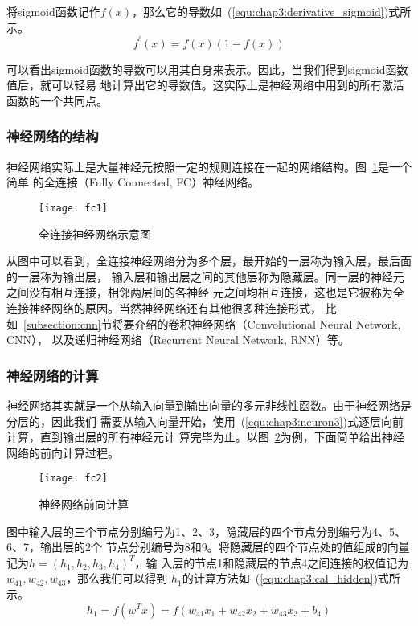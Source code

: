 将sigmoid函数记作$f(x)$，那么它的导数如~(\ref{equ:chap3:derivative_sigmoid})式所示。
\begin{equation}
  \label{equ:chap3:derivative_sigmoid}
  f^\prime(x) = f(x)(1-f(x))
\end{equation}

可以看出sigmoid函数的导数可以用其自身来表示。因此，当我们得到sigmoid函数值后，就可以轻易
地计算出它的导数值。这实际上是神经网络中用到的所有激活函数的一个共同点。

\subsubsection{神经网络的结构}

神经网络实际上是大量神经元按照一定的规则连接在一起的网络结构。图~\ref{fig:fc1}是一个简单
的全连接（Fully Connected, FC）神经网络。
\begin{figure}[ht]
  \centering
  \texttt{[image: fc1]}
  \caption{全连接神经网络示意图}
  \label{fig:fc1}
\end{figure}

从图中可以看到，全连接神经网络分为多个层，最开始的一层称为输入层，最后面的一层称为输出层，
输入层和输出层之间的其他层称为隐藏层。同一层的神经元之间没有相互连接，相邻两层间的各神经
元之间均相互连接，这也是它被称为全连接神经网络的原因。当然神经网络还有其他很多种连接形式，
比如~\ref{subsection:cnn}节将要介绍的卷积神经网络（Convolutional Neural Network, CNN），
以及递归神经网络（Recurrent Neural Network, RNN）等。

\subsubsection{神经网络的计算}

神经网络其实就是一个从输入向量到输出向量的多元非线性函数。由于神经网络是分层的，因此我们
需要从输入向量开始，使用~(\ref{equ:chap3:neuron3})式逐层向前计算，直到输出层的所有神经元计
算完毕为止。以图~\ref{fig:fc2}为例，下面简单给出神经网络的前向计算过程。
\begin{figure}[ht]
  \centering
  \texttt{[image: fc2]}
  \caption{神经网络前向计算}
  \label{fig:fc2}
\end{figure}

图中输入层的三个节点分别编号为1、2、3，隐藏层的四个节点分别编号为4、5、6、7，输出层的2个
节点分别编号为8和9。将隐藏层的四个节点处的值组成的向量记为$h=(h_1, h_2, h_3, h_4)^T$，输
入层的节点1和隐藏层的节点4之间连接的权值记为$w_{41}, w_{42}, w_{43}$，那么我们可以得到
$h_1$的计算方法如~(\ref{equ:chap3:cal_hidden})式所示。
\begin{equation}
  \label{equ:chap3:cal_hidden}
  h_1 = f(w^Tx)=f(w_{41}x_1+w_{42}x_2+w_{43}x_3+b_4)
\end{equation}

